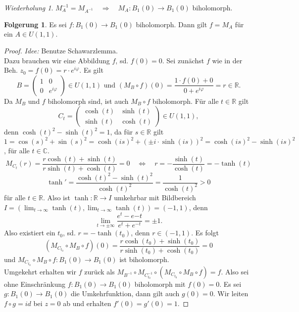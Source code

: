\documentclass[11pt,titlepage]{article}
\theoremstyle{definition}
\newtheorem{corollary}[theorem]{Folgerung}
\theoremstyle{remark}
\newtheorem*{repetition}{Wiederholung}
\begin{document}
	\begin{repetition}
		$M_{A}^{-1} =M_{A^{-1}} \quad\Rightarrow\quad M_A :B_1(0)\to B_1(0)$ biholomorph.
	\end{repetition}
	
	\begin{corollary}
		Es sei $f:B_1(0)\to B_1(0)$ biholomorph. Dann gilt $f=M_A$ für ein $A\in U(1,1)$.
	\end{corollary}
	
	\begin{proof}
		\textsl{Idee:} Benutze Schawarzlemma. \\
		Dazu brauchen wir eine Abbildung $f$, sd. $f(0)=0$. Sei zunächst $f$ wie in der Beh. 
		$z_0 =f(0)=r\cdot e^{i\varphi}$. Es gilt
		\[ B=\begin{pmatrix}1&0\\0&e^{i\varphi}\end{pmatrix}\in U(1,1) \text{   und   } 
		(M_B \circ f)(0)=\frac{1\cdot f(0)+0}{0+e^{i\varphi}}=r\in\mathbb{R}. \]
		Da $M_B$ und $f$ biholomorph sind, ist auch $M_B \circ f$ biholomorph. Für alle 
		$t\in\mathbb{R}$ gilt 
		\[C_t =\begin{pmatrix}\cosh(t)&\sinh(t)\\ \sinh(t)&\cosh(t)\end{pmatrix}\in U(1,1),\]
		denn $\cosh(t)^2 -\sinh(t)^2 =1$, da für $s\in\mathbb{R}$ gilt 
		$1=\cos(s)^2+\sin(s)^2=\cosh(is)^2+(±i\cdot \sinh(is))^2 =\cosh(is)^2-\sinh(is)^2$, für alle 
		$t\in\mathbb{C}$.
		\[ M_{C_t}(r)=\frac{r \cosh(t)+\sinh(t)}{r\sinh(t)+\cosh(t)}=0 \quad\Leftrightarrow\quad 
		r=-\frac{\sinh(t)}{\cosh(t)}=-\tanh(t) \]
		\[\tanh' =\frac{\cosh(t)^2 -\sinh(t)^2}{\cosh(t)^2}=\frac{1}{\cosh(t)^2}>0 \]
		für alle $t\in\mathbb{R}$. Also ist $\tanh :\mathbb{R}\to I$ umkehrbar mit Bildbereich 
		$I=(\lim_{t\to\infty}\tanh(t) ,\lim_{t\to\infty} \tanh(t))=(-1,1)$, denn 
		\[ \lim_{t\to ±\infty} \frac{e^t -e{-t}}{e^t +e^{-t}}=±1. \]
		Also existiert ein $t_0$, sd. $r=-\tanh(t_0)$, denn $r\in (-1,1)$. Es folgt
		\[(M_{C_{t_0}}\circ M_B \circ f)(0)=\frac{r\cosh(t_0)+\sinh(t_0)}{r\sinh(t_0)+\cosh(t_0)}=0 \]
		und $M_{C_{t_0}}\circ M_B\circ f:B_1(0)\to B_1(0)$ ist biholomorph. \\
		Umgekehrt erhalten wir $f$ zurück als $M_{B^{-1}}\circ M_{C_{t_0}^{-1}}\circ 
		(M_{C_{t_0}}\circ M_B \circ f)=f$. Also sei ohne Einschränkung $f:B_1(0)\to B_1(0)$ 
		biholomorph mit $f(0)=0$. Es sei $g:B_1(0)\to B_1(0)$ die Umkehrfunktion, dann gilt auch 
		$g(0)=0$. Wir leiten $f\circ g=id$ bei $z=0$ ab und erhalten $f'(0)=g'(0)=1$. 

\end{proof}
\end{document}
